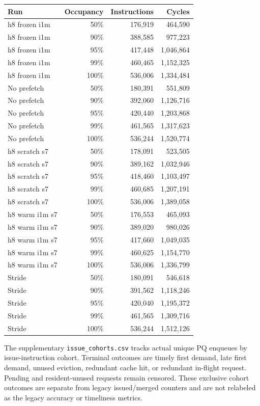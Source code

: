 \documentclass[10pt]{article}
\begin{document}
\begin{center}
\small
\begin{longtable}{lrrr}
\toprule
Run & Occupancy & Instructions & Cycles \\
\midrule
\endhead
h8 frozen i1m & 50\% & 176,919 & 464,590 \\
h8 frozen i1m & 90\% & 388,585 & 977,223 \\
h8 frozen i1m & 95\% & 417,448 & 1,046,864 \\
h8 frozen i1m & 99\% & 460,465 & 1,152,325 \\
h8 frozen i1m & 100\% & 536,006 & 1,334,484 \\
No prefetch & 50\% & 180,391 & 551,809 \\
No prefetch & 90\% & 392,060 & 1,126,716 \\
No prefetch & 95\% & 420,440 & 1,203,868 \\
No prefetch & 99\% & 461,565 & 1,317,623 \\
No prefetch & 100\% & 536,244 & 1,520,774 \\
h8 scratch s7 & 50\% & 178,091 & 523,505 \\
h8 scratch s7 & 90\% & 389,162 & 1,032,946 \\
h8 scratch s7 & 95\% & 418,460 & 1,103,497 \\
h8 scratch s7 & 99\% & 460,685 & 1,207,191 \\
h8 scratch s7 & 100\% & 536,006 & 1,389,058 \\
h8 warm i1m s7 & 50\% & 176,553 & 465,093 \\
h8 warm i1m s7 & 90\% & 389,020 & 980,026 \\
h8 warm i1m s7 & 95\% & 417,660 & 1,049,035 \\
h8 warm i1m s7 & 99\% & 460,625 & 1,154,770 \\
h8 warm i1m s7 & 100\% & 536,006 & 1,336,799 \\
Stride & 50\% & 180,091 & 546,618 \\
Stride & 90\% & 391,562 & 1,118,246 \\
Stride & 95\% & 420,040 & 1,195,372 \\
Stride & 99\% & 461,565 & 1,309,716 \\
Stride & 100\% & 536,244 & 1,512,126 \\
\bottomrule
\end{longtable}
\end{center}

The supplementary \texttt{issue\_cohorts.csv} tracks actual unique PQ enqueues by issue-instruction cohort. Terminal outcomes are timely first demand, late first demand, unused eviction, redundant cache hit, or redundant in-flight request. Pending and resident-unused requests remain censored. These exclusive cohort outcomes are separate from legacy issued/merged counters and are not relabeled as the legacy accuracy or timeliness metrics.
\end{document}
